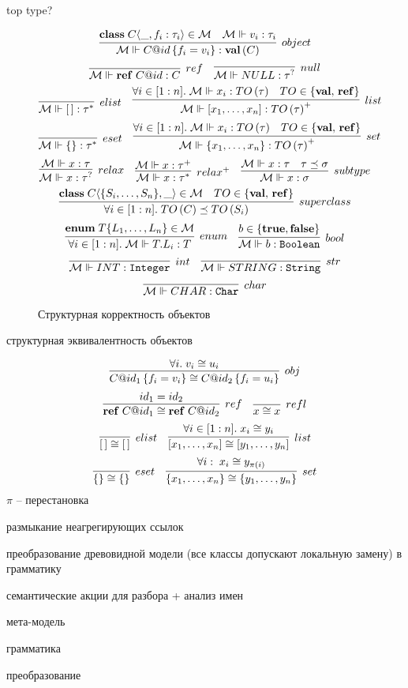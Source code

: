 top type?
\newcommand{\classf}[3]{\mathbf{class}\; #1 \langle #2, #3\rangle}
\newcommand{\type}[2]{#1\left(#2\right)}
\newcommand{\valts}{\mathbf{val}}
\newcommand{\valt}[1]{\type{\valts}{#1}}
\newcommand{\refts}{\mathbf{ref}}
\newcommand{\reft}[1]{\type{\refts}{#1}}
\newcommand{\refv}[2]{\mathbf{ref}\; #1@#2}
\newcommand{\reference}[3]{\mathbf{#1}\langle #2 : #3\rangle}
\newcommand{\attribute}[2]{\mathbf{attr}\langle #1 : #2\rangle}
\newcommand{\obj}[3]{#1@#2\left\{#3\right\}}
\newcommand{\fromMM}{\MM{M} \Vdash}
\begin{figure}[htbp]
	\centering
$$
	\infer[object]{
		\fromMM \obj{C}{id}{f_i = v_i} : \valt{C}
	}{
		\classf{C}{\_}{f_i : \tau_i} \in \MM{M}&
		\fromMM v_i : \tau_i
	}
$$
$$
\infer[ref]{
	\fromMM \refv{C}{id} : C
}{}
\quad
\infer[null]{
	\fromMM NULL : \tau^?
}{}
$$
$$
\infer[elist]{
	\fromMM [\,] : \tau^*
}{}
\quad
\infer[list]{
	\fromMM [x_1, \ldots, x_n] : \type{TO}{\tau}^+
}{
	\forall i\in[1:n]. \; \fromMM x_i : \type{TO}{\tau} &
	TO \in \{\valts,\, \refts\}
}
$$
$$
\infer[eset]{
	\fromMM \{\} : \tau^*
}{}
\quad
\infer[set]{
	\fromMM \{x_1, \ldots, x_n\} : \type{TO}{\tau}^+
}{
	\forall i\in[1:n]. \; \fromMM x_i : \type{TO}{\tau} &
	TO \in \{\valts,\, \refts\}
}
$$
$$
\infer[relax]{
	\fromMM x : \tau^?
}{
	\fromMM x : \tau
}
\quad
\infer[relax^+]{
	\fromMM x : \tau^*
}{
	\fromMM x : \tau^+
}
\quad
\infer[subtype]{
	\fromMM x : \sigma
}{
	\fromMM x : \tau &
	\tau \subtype \sigma
}
$$
$$
\infer[superclass]{
	\forall i \in [1:n].\; \type{TO}{C} \subtype \type{TO}{S_i}
}{
	\classf{C}{\{S_i, \ldots, S_n\}}{\_} \in \MM{M} &
	TO \in \{\valts,\, \refts\}
}
$$
$$
\infer[enum]{
	\forall i \in [1:n]. \; \fromMM T.L_i : T
}{
	\mathbf{enum}\;T\{L_1,\ldots,L_n\} \in \MM{M}
}
\quad
\infer[bool]{
	\fromMM b : \mathtt{Boolean}
}{
	b \in \{\mathbf{true}, \mathbf{false}\}
}
$$
$$
\infer[int]{\fromMM INT : \mathtt{Integer}}{}
\quad
\infer[str]{\fromMM STRING : \mathtt{String}}{}
$$
$$
\infer[char]{\fromMM CHAR : \mathtt{Char}}{}
$$
	\caption{Структурная корректность объектов}\label{TypesMM}
\end{figure}

структурная эквивалентность объектов

$$
\infer[obj]{
	\obj{C}{id_1}{f_i = v_i} \cong \obj{C}{id_2}{f_i = u_i}
}{
	\forall i. \; v_i \cong u_i
}
$$
$$
\infer[ref]{
	\refv{C}{id_1} \cong \refv{C}{id_2}
}{
	id_1 = id_2
}
\quad
\infer[refl]{x \cong x}{}
$$
$$
\infer[elist]{[\,] \cong [\,]}{}
\quad
\infer[list]{
	[x_1,\ldots,x_n] \cong [y_1,\ldots,y_n]
}{
	\forall i \in [1:n]. \; x_i \cong y_i
}
$$
$$
\infer[eset]{\{\} \cong \{\}}{}
\quad
\infer[set]{
	\{x_1,\ldots,x_n\} \cong \{y_1,\ldots,y_n\}
}{
	\forall i :\; x_i \cong y_{\pi(i)}
}
$$
$\pi$ -- перестановка

размыкание неагрегирующих ссылок

преобразование древовидной модели (все классы допускают локальную замену) в грамматику

семантические акции для разбора + анализ имен

мета-модель

грамматика

преобразование
